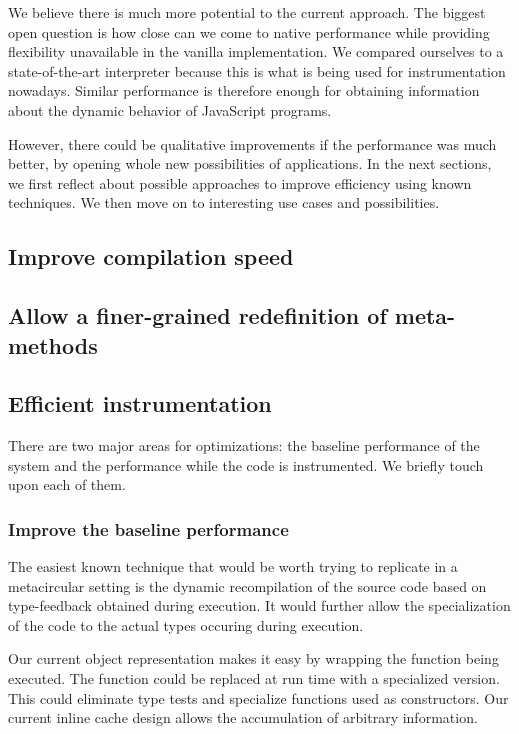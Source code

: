 We believe there is much more potential to the current approach. The
biggest open question is how close can we come to native performance while
providing flexibility unavailable in the vanilla implementation. We compared
ourselves to a state-of-the-art interpreter because this is what is being used
for instrumentation nowadays. Similar performance is therefore enough for
obtaining information about the dynamic behavior of JavaScript programs. 

However, there could be qualitative improvements if the performance was much
better, by opening whole new possibilities of applications.  In the next
sections, we first reflect about possible approaches to improve efficiency
using known techniques. We then move on to interesting use cases and
possibilities.

\subsection{Improve compilation speed}

\subsection{Allow a finer-grained redefinition of meta-methods}

\subsection{Efficient instrumentation}

There are two major areas for optimizations: the baseline performance of the
system and the performance while the code is instrumented. We briefly touch
upon each of them. 

\subsubsection{Improve the baseline performance}

The easiest known technique that would be worth trying to replicate in a
metacircular setting is the dynamic recompilation of the source code based on
type-feedback obtained during execution. It would further allow the
specialization of the code to the actual types occuring during execution.

Our current object representation makes it easy by wrapping the function being
executed.  The function could be replaced at run time with a specialized
version. This could eliminate type tests and specialize functions used as
constructors. Our current inline cache design allows the accumulation of
arbitrary information.

